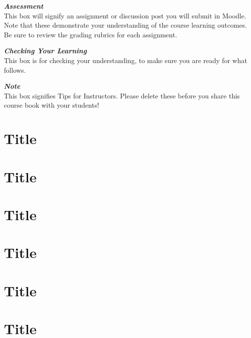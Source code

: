 \documentclass[
]{book}
\begin{document}
\begin{assessment}
\textbf{\emph{Assessment}}\\
This box will signify an assignment or discussion post you will submit
in Moodle. Note that these demonstrate your understanding of the course
learning outcomes. Be sure to review the grading rubrics for each
assignment.
\end{assessment}

\begin{progress}
\textbf{\emph{Checking Your Learning}}\\
This box is for checking your understanding, to make sure you are ready
for what follows.
\end{progress}

\begin{feedback}
\textbf{\emph{Note}}\\
This box signifies Tips for Instructors. Please delete these before you
share this course book with your students!
\end{feedback}

\hypertarget{title}{%
\chapter{Title}\label{title}}

\hypertarget{title-1}{%
\chapter{Title}\label{title-1}}

\hypertarget{title-2}{%
\chapter{Title}\label{title-2}}

\hypertarget{title-3}{%
\chapter{Title}\label{title-3}}

\hypertarget{title-4}{%
\chapter{Title}\label{title-4}}

\hypertarget{title-5}{%
\chapter{Title}\label{title-5}}
\end{document}
